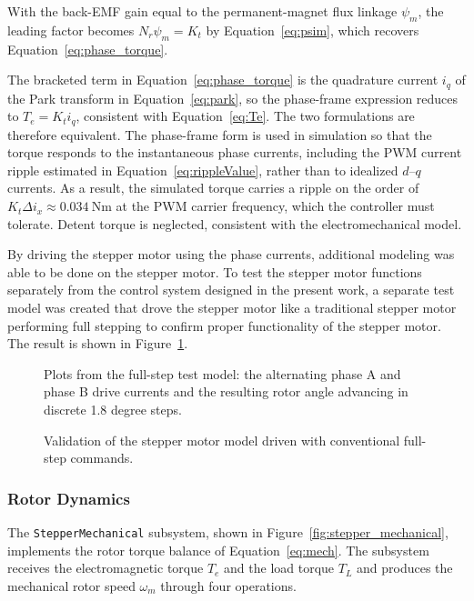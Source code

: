 With the back-EMF gain equal to the permanent-magnet flux linkage $\psi_m$, the leading factor becomes $N_r \psi_m = K_t$ by Equation~\eqref{eq:psim}, which recovers Equation~\eqref{eq:phase_torque}.

The bracketed term in Equation~\eqref{eq:phase_torque} is the quadrature current $i_q$ of the Park transform in Equation~\eqref{eq:park}, so the phase-frame expression reduces to $T_e = K_t i_q$, consistent with Equation~\eqref{eq:Te}. The two formulations are therefore equivalent. The phase-frame form is used in simulation so that the torque responds to the instantaneous phase currents, including the PWM current ripple estimated in Equation~\eqref{eq:rippleValue}, rather than to idealized $d$--$q$ currents. As a result, the simulated torque carries a ripple on the order of $K_t \Delta i_x \approx \SI{0.034}{\newton\metre}$ at the PWM carrier frequency, which the controller must tolerate. Detent torque is neglected, consistent with the electromechanical model.


By driving the stepper motor using the phase currents, additional modeling was able to be done on the stepper motor. To test the stepper motor functions separately from the control system designed in the present work, a separate test model was created that drove the stepper motor like a traditional stepper motor performing full stepping to confirm proper functionality of the stepper motor. The result is shown in Figure~\ref{fig:fullstep_validation}.

\begin{figure}[htbp]
	\centering
		{Plots from the full-step test model: the alternating phase A and phase B drive currents and the resulting rotor angle advancing in discrete 1.8 degree steps.}
	\caption[Full-step validation of the motor model]{Validation of the stepper motor model driven with conventional full-step commands.}
	\label{fig:fullstep_validation}
\end{figure}
\subsubsection{Rotor Dynamics}

The \texttt{StepperMechanical} subsystem, shown in %
Figure~\ref{fig:stepper_mechanical}, implements the rotor torque balance of Equation~\eqref{eq:mech}. The subsystem receives the electromagnetic torque $T_e$ and the load torque $T_L$ and produces the mechanical rotor speed $\omega_m$ through four operations.

